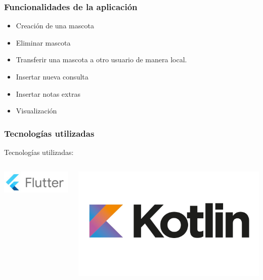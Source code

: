 \documentclass[14pt]{beamer}
\begin{document}
\begin{frame}
\frametitle{Funcionalidades de la aplicación}
\begin{itemize}
\item Creación de una mascota
\item Eliminar mascota
\item Transferir una mascota a otro usuario de manera local.
\item Insertar nueva consulta
\item Insertar notas extras
\item Visualización

\end{itemize}

\end{frame}


\begin{frame}
\frametitle{Tecnologías utilizadas}

Tecnologías utilizadas:



\begin{columns}
\begin{column}{0.3\textwidth}
\begin{center}

\includegraphics[scale =0.45]{Images/LogodeFlutter.jpg}\\

\end{center}
\end{column}
\begin{column}{0.3\textwidth}
\begin{center}

\includegraphics[scale =0.10]{Images/LogoKotlin.jpg}\\


\end{center}
\end{column}
\end{columns}
\end{frame}
\end{document}
